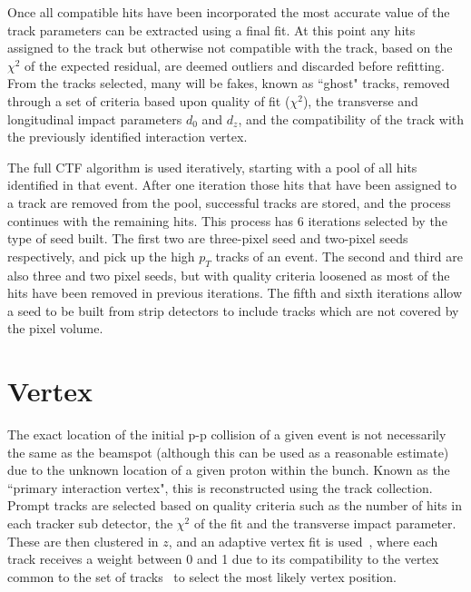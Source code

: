 Once all compatible hits have been incorporated the most accurate value of the track parameters can be extracted using a final fit. At this point any hits assigned to the track but otherwise not compatible with the track, based on the $\chi^{2}$ of the expected residual, are deemed outliers and discarded before refitting. From the tracks selected, many will be fakes, known as ``ghost" tracks, removed through a set of criteria based upon quality of fit ($\chi^{2}$), the transverse and longitudinal impact parameters $d_{0}$ and $d_{z}$, and the compatibility of the track with the previously identified interaction vertex. 

The full CTF algorithm is used iteratively, starting with a pool of all hits identified in that event. After one iteration those hits that have been assigned to a track are removed from the pool, successful tracks are stored, and the process continues with the remaining hits. This process has 6 iterations selected by the type of seed built. The first two are three-pixel seed and two-pixel seeds respectively, and pick up the high $p_{T}$ tracks of an event. The second and third are also three and two pixel seeds, but with quality criteria loosened as most of the hits have been removed in previous iterations. The fifth and sixth iterations allow a seed to be built from strip detectors to include tracks which are not covered by the pixel volume.

\section{Vertex}

The exact location of the initial p-p collision of a given event is not necessarily the same as the beamspot (although this can be used as a reasonable estimate) due to the unknown location of a given proton within the bunch. Known as the ``primary interaction vertex", this is reconstructed using the track collection. Prompt tracks are selected based on quality criteria such as the number of hits in each tracker sub detector, the $\chi^{2}$ of the fit and the transverse impact parameter. These are then clustered in $z$, and an adaptive vertex fit is used~\cite{AVF}, where each track receives a weight between 0 and 1 due to its compatibility to the vertex common to the set of tracks~\cite{TRK-10-005} to select the most likely vertex position. 


